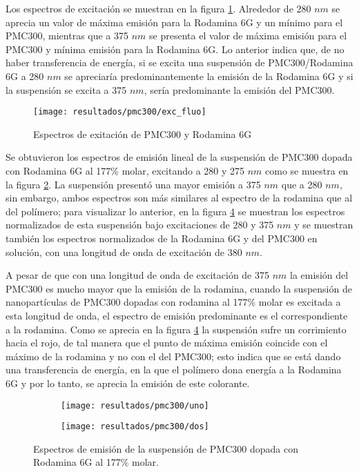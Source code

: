 Los espectros de excitaci\'on se muestran en la figura \ref{exc}. Alrededor de 280 $nm$ se aprecia un valor de m\'axima emisi\'on para la Rodamina 6G y un m\'inimo para el PMC300, mientras que a 375 $nm$ se presenta el valor de m\'axima emisi\'on para el PMC300 y m\'inima emisi\'on para la Rodamina 6G. Lo anterior indica que, de no haber transferencia de energ\'ia, si se excita una suspensi\'on de PMC300/Rodamina 6G a 280 $nm$ se apreciar\'ia predominantemente la emisi\'on de la Rodamina 6G y si la suspensi\'on se excita a 375 $nm$, ser\'ia predominante la emisi\'on del PMC300.

\begin{figure}[H]
\centering
\texttt{[image: resultados/pmc300/exc\_fluo]}
\caption{Espectros de exitaci\'on de PMC300 y Rodamina 6G\label{exc}}
\end{figure}

Se obtuvieron los espectros de emisi\'on lineal de la suspensi\'on de PMC300 dopada con Rodamina 6G al 177\% molar, excitando a 280 y 275 $nm$ como se muestra en la figura \ref{normalita}. La suspensi\'on present\'o una mayor emisi\'on a 375 $nm$ que a 280 $nm$, sin embargo, ambos espectros son m\'as similares al espectro de la rodamina que al del pol\'imero; para visualizar lo anterior, en la figura \ref{norm2} se muestran los espectros normalizados de esta suspensi\'on bajo excitaciones de 280 y 375 $nm$ y se muestran tambi\'en los espectros normalizados de la Rodamina 6G y del PMC300 en soluci\'on, con una longitud de onda de excitaci\'on de 380 $nm$. 

A pesar de que con una longitud de onda de excitaci\'on de 375 $nm$ la emisi\'on del PMC300 es mucho mayor que la emisi\'on de la rodamina, cuando la suspensi\'on de nanopart\'iculas de PMC300 dopadas con rodamina al 177\% molar es excitada a esta longitud de onda, el espectro de emisi\'on predominante es el correspondiente a la rodamina. Como se aprecia en la figura \ref{norm2} la suspensi\'on sufre un corrimiento hacia el rojo, de tal manera que el punto de m\'axima emisi\'on coincide con el m\'aximo de la rodamina y no con el del PMC300; esto indica que se est\'a dando una transferencia de energ\'ia, en la que el pol\'imero dona energ\'ia a la Rodamina 6G y por lo tanto, se aprecia la emisi\'on de este colorante.

\begin{figure}[H]
\centering
\begin{subfigure}{0.51\textwidth}
\centering
\texttt{[image: resultados/pmc300/uno]}
\caption{ }\label{normalita}
\end{subfigure}
\begin{subfigure}{0.48\textwidth}
\centering
\texttt{[image: resultados/pmc300/dos]}
\caption{  }\label{norm2}
\end{subfigure}
\caption{Espectros de emisi\'on de la suspensi\'on de PMC300 dopada con Rodamina 6G al 177\% molar.}
\end{figure}

